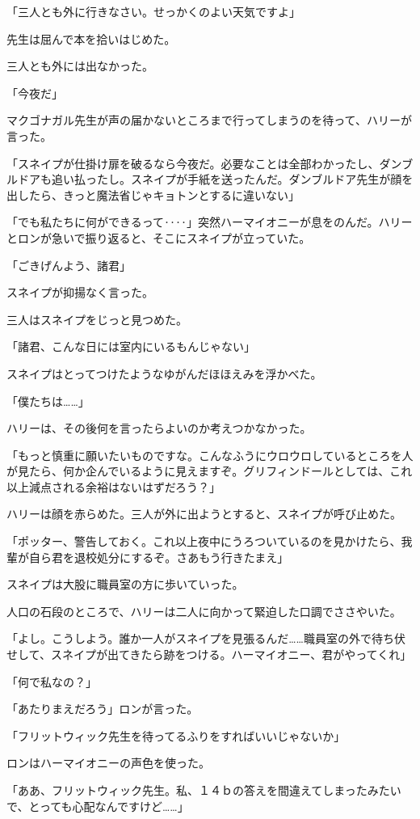 \documentclass[10pt,a4paper]{article}
\begin{document}
\begin{CJK}{UTF8}{min}
「三人とも外に行きなさい。せっかくのよい天気ですよ」

先生は屈んで本を拾いはじめた。

三人とも外には出なかった。

「今夜だ」

マクゴナガル先生が声の届かないところまで行ってしまうのを待って、ハリーが言った。

「スネイプが仕掛け扉を破るなら今夜だ。必要なことは全部わかったし、ダンブルドアも追い払ったし。スネイプが手紙を送ったんだ。ダンブルドア先生が顔を出したら、きっと魔法省じゃキョトンとするに違いない」

「でも私たちに何ができるって‥‥」突然ハーマイオニーが息をのんだ。ハリーとロンが急いで振り返ると、そこにスネイプが立っていた。

「ごきげんよう、諸君」

スネイプが抑揚なく言った。

三人はスネイプをじっと見つめた。

「諸君、こんな日には室内にいるもんじゃない」

スネイプはとってつけたようなゆがんだほほえみを浮かべた。

「僕たちは……」

ハリーは、その後何を言ったらよいのか考えつかなかった。

「もっと慎重に願いたいものですな。こんなふうにウロウロしているところを人が見たら、何か企んでいるように見えますぞ。グリフィンドールとしては、これ以上減点される余裕はないはずだろう？」

ハリーは顔を赤らめた。三人が外に出ようとすると、スネイプが呼び止めた。

「ポッター、警告しておく。これ以上夜中にうろついているのを見かけたら、我輩が自ら君を退校処分にするぞ。さあもう行きたまえ」

スネイプは大股に職員室の方に歩いていった。

人口の石段のところで、ハリーは二人に向かって緊迫した口調でささやいた。

「よし。こうしよう。誰か一人がスネイプを見張るんだ……職員室の外で待ち伏せして、スネイプが出てきたら跡をつける。ハーマイオニー、君がやってくれ」

「何で私なの？」

「あたりまえだろう」ロンが言った。

「フリットウィック先生を待ってるふりをすればいいじゃないか」

ロンはハーマイオニーの声色を使った。

「ああ、フリットウィック先生。私、１４ｂの答えを間違えてしまったみたいで、とっても心配なんですけど……」


\end{CJK}
\end{document}
